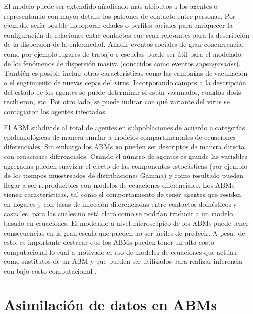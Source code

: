 El modelo puede ser extendido añadiendo más atributos a los agentes o representando con mayor detalle los patrones de contacto entre personas. Por ejemplo, sería posible incorporar edades o perfiles sociales para enriquecer la configuración de relaciones entre contactos que sean relevantes para la descripción de la dispersión de la enfermedad. Añadir eventos sociales de gran concurrencia, como por ejemplo lugares de trabajo o escuelas puede ser útil para el modelado de los fenómenos de dispersión masiva (conocidos como eventos \textit{superspreader}). También es posible incluir otras características como las campañas de vacunación o el sugrimiento de nuevas cepas del virus. Incorporando campos a la descripción del estado de los agentes se puede determinar si están vacunados, cuantas dosis recibieron, etc. Por otro lado, se puede indicar con qué variante del virus se contagiaron los agentes infectados.

El ABM subdivide al total de agentes en subpoblaciones de acuerdo a categorías epidemiológicas de manera similar a modelos compartimentales de ecuaciones diferenciales. Sin embargo los ABMs no pueden ser descriptos de manera directa con ecuaciones diferenciales. Cuando el número de agentes es grande las variables agregadas pueden suavizar el efecto de las componentes estocásticas (por ejemplo de los tiempos muestreados de distribuciones Gamma) y como resultado pueden llegar a ser reproducibles con modelos de ecuaciones diferenciales. Los ABMs tienen características, tal como el comportamiento de tener agentes que residen en hogares y con tasas de infección diferenciadas entre contactos domésticos y casuales, para las cuales no está claro como se podrían traducir a un modelo basado en ecuaciones. El modelado a nivel microscópico de los ABMs puede tener consecuencias en la gran escala que pueden no ser fáciles de predecir. A pesar de esto, es importante destacar que los ABMs pueden tener un alto costo computacional lo cual a motivado el uso de modelos de ecuaciones que actúan como sustitutos de un ABM y que pueden ser utilizados para realizar inferencia con bajo costo computacional \citep{Hooten2020}.

\section{Asimilación de datos en ABMs}

